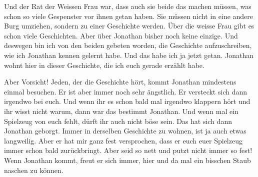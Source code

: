 \begin{mdframed}[style=mystyle]
Und der Rat der Weissen Frau war, dass auch sie beide das machen müssen, was schon so viele Gespenster vor ihnen getan haben. Sie müssen nicht in eine andere Burg umziehen, sondern zu einer Geschichte werden. Über die weisse Frau gibt es schon viele Geschichten. Aber über Jonathan bisher noch keine einzige. Und deswegen bin ich von den beiden gebeten worden, die Geschichte aufzuschreiben, wie ich Jonathan kennen gelernt habe. Und das habe ich ja jetzt getan. Jonathan wohnt hier in dieser Geschichte, die ich euch gerade erzählt habe. 

Aber Vorsicht! Jeden, der die Geschichte hört, kommt Jonathan mindestens einmal besuchen. Er ist aber immer noch sehr ängstlich. Er versteckt sich dann irgendwo bei euch. Und wenn ihr es schon bald mal irgendwo klappern hört und ihr wisst nicht warum, dann war das bestimmt Jonathan. Und wenn mal ein Spielzeug von euch fehlt, dürft ihr auch nicht böse sein. Das hat sich dann Jonathan geborgt. Immer in derselben Geschichte zu wohnen, ist ja auch etwas langweilig. Aber er hat mir ganz fest versprochen, dass er euch euer Spielzeug immer schon bald zurückbringt. Aber seid so nett und putzt nicht immer so fest! Wenn Jonathan kommt, freut er sich immer, hier und da mal ein bisschen Staub naschen zu können. \hfill {\color{red}\decofourleft}
\end{mdframed}

